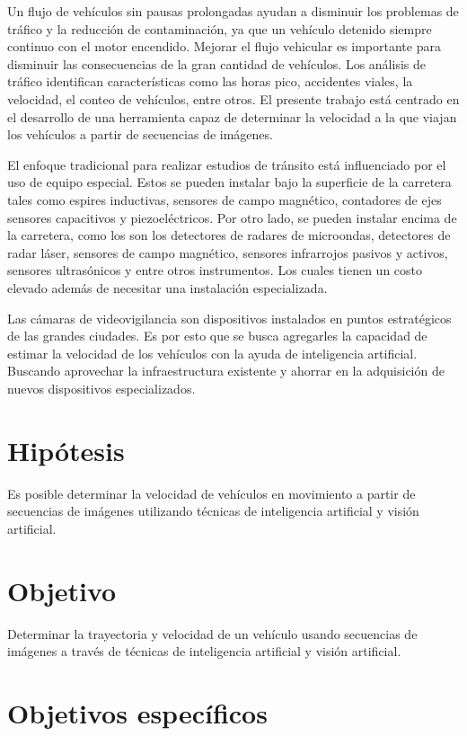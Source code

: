 Un flujo de vehículos sin pausas prolongadas ayudan a disminuir los problemas de tráfico y la reducción de contaminación, ya que un vehículo detenido siempre continuo con el motor encendido. Mejorar el flujo vehicular es importante para disminuir las consecuencias de la gran cantidad de vehículos. Los análisis de tráfico identifican características como las horas pico, accidentes viales, la velocidad, el conteo de vehículos, entre otros. El presente trabajo está centrado en el desarrollo de una herramienta capaz de determinar la velocidad a la que viajan los vehículos a partir de secuencias de imágenes.

El enfoque tradicional para realizar estudios de tránsito está influenciado por el uso de equipo especial. Estos se pueden instalar bajo la superficie de la carretera tales como espires inductivas, sensores de campo magnético, contadores de ejes sensores capacitivos y piezoeléctricos. Por otro lado, se pueden instalar encima de la carretera, como los son los detectores de radares de microondas, detectores de radar láser, sensores de campo magnético, sensores infrarrojos pasivos y activos, sensores ultrasónicos y entre otros instrumentos. Los cuales tienen un costo elevado además de necesitar una instalación especializada.

Las cámaras de videovigilancia son dispositivos instalados en puntos estratégicos de las grandes ciudades. Es por esto que se busca agregarles la capacidad de estimar la velocidad de los vehículos con la ayuda de inteligencia artificial. Buscando aprovechar la infraestructura existente y ahorrar en la adquisición de nuevos dispositivos especializados.

\section{Hipótesis}

Es posible determinar la velocidad de vehículos en movimiento a partir de secuencias de imágenes utilizando técnicas de inteligencia artificial y visión artificial.

\section{Objetivo}

Determinar la trayectoria y velocidad de un vehículo usando secuencias de imágenes a través de técnicas de inteligencia artificial y visión artificial.

\section{Objetivos específicos}

